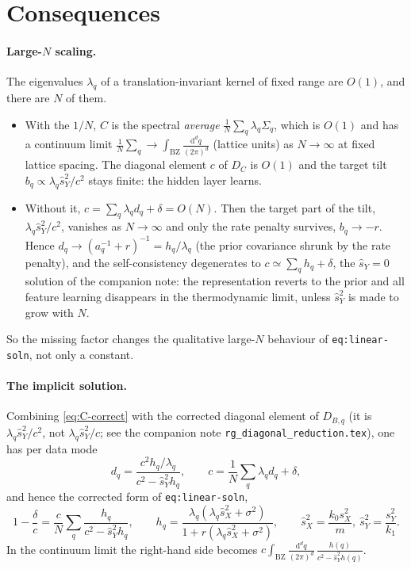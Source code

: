\documentclass[11pt,a4paper]{article}
\begin{document}
\section{Consequences}
\paragraph{Large-$N$ scaling.}
The eigenvalues $\lambda_q$ of a translation-invariant kernel of fixed range are $O(1)$, and there are $N$ of them.
\begin{itemize}
  \item With the $1/N$, $C$ is the spectral \emph{average} $\frac1N\sum_q \lambda_q \Sigma_q$, which is $O(1)$ and has a continuum limit
  $\frac1N\sum_q \to \int_{\mathrm{BZ}} \frac{\mathrm d^d q}{(2\pi)^d}$ (lattice units) as $N\to\infty$ at fixed lattice spacing.
  The diagonal element $c$ of $D_C$ is $O(1)$ and the target tilt $b_q \propto \lambda_q \hat s_Y^2 / c^2$ stays finite: the hidden layer learns.
  \item Without it, $c = \sum_q \lambda_q d_q + \delta = O(N)$. Then the target part of the tilt, $\lambda_q\hat s_Y^2/c^2$, vanishes as $N\to\infty$ and only the rate penalty survives, $b_q \to -r$. Hence $d_q \to (a_q^{-1}+r)^{-1} = h_q/\lambda_q$ (the prior covariance shrunk by the rate penalty), and the self-consistency degenerates to $c \simeq \sum_q h_q + \delta$, the $\hat s_Y = 0$ solution of the companion note: the representation reverts to the prior and all feature learning disappears in the thermodynamic limit, unless $\hat s_Y^2$ is made to grow with $N$.
\end{itemize}
So the missing factor changes the qualitative large-$N$ behaviour of \texttt{eq:linear-soln}, not only a constant.

\paragraph{The implicit solution.}
Combining \eqref{eq:C-correct} with the corrected diagonal element of $D_{B,q}$ (it is $\lambda_q\hat s_Y^2/c^2$, not $\lambda_q\hat s_Y^2/c$; see the companion note \texttt{rg\_diagonal\_reduction.tex}), one has per data mode
\begin{equation}
  d_q = \frac{c^2 h_q/\lambda_q}{c^2 - \hat s_Y^2 h_q},
  \qquad
  c = \frac1N\sum_q \lambda_q d_q + \delta ,
\end{equation}
and hence the corrected form of \texttt{eq:linear-soln},
\begin{equation}
  1 - \frac{\delta}{c} = \frac{c}{N}\sum_q \frac{h_q}{c^2 - \hat s_Y^2 h_q},
  \qquad
  h_q = \frac{\lambda_q(\lambda_q\hat s_X^2 + \sigma^2)}{1 + r(\lambda_q \hat s_X^2 + \sigma^2)},
  \qquad
  \hat s_X^2 = \frac{k_0 s_X^2}{m},\ \hat s_Y^2 = \frac{s_Y^2}{k_1}.
  \label{eq:linear-soln-corrected}
\end{equation}
In the continuum limit the right-hand side becomes $c\int_{\mathrm{BZ}}\frac{\mathrm d^dq}{(2\pi)^d}\,\frac{h(q)}{c^2-\hat s_Y^2 h(q)}$.
\end{document}
